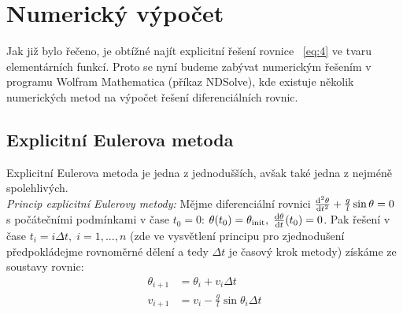 \documentclass[reqno, a4paper]{amsart}
\begin{document}
\clearpage
\section{Numerický výpočet}
Jak již bylo řečeno, je obtížné najít explicitní řešení rovnice ~\eqref{eq:4} ve tvaru elementárních funkcí. Proto se nyní budeme zabývat numerickým řešením v programu Wolfram Mathematica (příkaz NDSolve), kde existuje několik numerických metod na výpočet řešení diferenciálních rovnic.
\subsection{Explicitní Eulerova metoda}
Explicitní Eulerova metoda je jedna z jednodušších, avšak také jedna z nejméně spolehlivých.
\\
\textit{Princip explicitní Eulerovy metody:} Mějme diferenciální rovnici $\frac{\mathrm{d}^2 {\theta}}{\mathrm{d} {t}^2} + \frac{g}{l} \sin \theta = 0$ s počátečními podmínkami v čase $t_{0}=0$: $\theta(t_{0})=\theta_{\mathrm{init}},\; \frac{\mathrm{d} {\theta}}{\mathrm{d} {t}}(t_{0})=0$. Pak řešení v čase $t_{i}=i\Delta t,\; i=1,...,n$ (zde ve vysvětlení principu pro zjednodušení předpokládejme rovnoměrné dělení a tedy $ \Delta t$ je časový krok metody) získáme ze soustavy rovnic: 
\begin{align}
	\theta_{i+1}& =\theta_{i}+v_{i}\Delta t\\
	v_{i+1}& =v_{i}-\frac{g}{l}\sin\theta_{i}\Delta t
\end{align}
\end{document}
